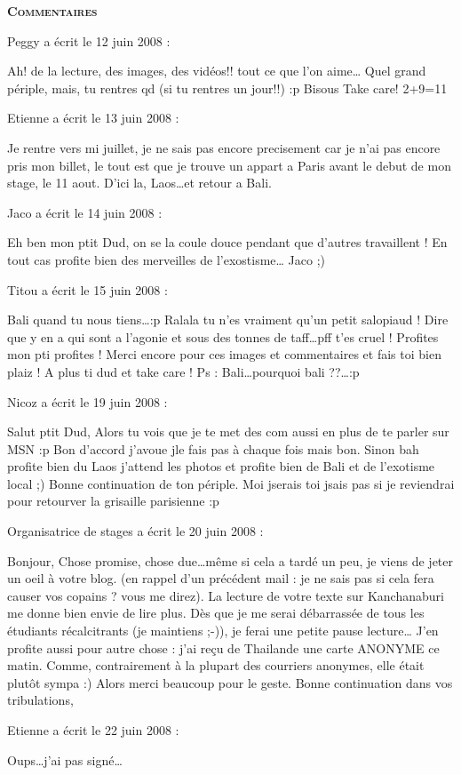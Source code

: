 \bigskip
\textbf{\textsc{Commentaires}}

\medskip
Peggy a écrit le 12 juin 2008 :
\begin{displayquote}
Ah! de la lecture, des images, des vidéos!! tout ce que l'on aime\dots
Quel grand périple, mais, tu rentres qd (si tu rentres un jour!!) :p
Bisous
Take care!
2+9=11
\end{displayquote}

\medskip
Etienne a écrit le 13 juin 2008 :
\begin{displayquote}
Je rentre vers mi juillet, je ne sais pas encore precisement car je n'ai pas encore pris mon billet, le tout est que je trouve un appart a Paris avant le debut de mon stage, le 11 aout.
D'ici la, Laos\dots et retour a Bali.
\end{displayquote}

\medskip
Jaco a écrit le 14 juin 2008 :
\begin{displayquote}
Eh ben mon ptit Dud, on se la coule douce pendant que d'autres travaillent !
En tout cas profite bien des merveilles de l'exostisme\dots
Jaco ;)
\end{displayquote}

\medskip
Titou a écrit le 15 juin 2008 :
\begin{displayquote}
Bali quand tu nous tiens\dots :p
Ralala tu n'es vraiment qu'un petit salopiaud ! Dire que y en a qui sont a l'agonie et sous des tonnes de taff\dots pff t'es cruel !
Profites mon pti profites !
Merci encore pour ces images et commentaires et fais toi bien plaiz !
A plus ti dud et take care !
Ps : Bali\dots pourquoi bali ??\dots :p
\end{displayquote}

\medskip
Nicoz a écrit le 19 juin 2008 :
\begin{displayquote}
Salut ptit Dud,
Alors tu vois que je te met des com aussi en plus de te parler sur MSN :p
Bon d'accord j'avoue jle fais pas à chaque fois mais bon.
Sinon bah profite bien du Laos j'attend les photos et profite bien de Bali et de l'exotisme local ;)
Bonne continuation de ton périple.
Moi jserais toi jsais pas si je reviendrai pour retourver la grisaille parisienne :p
\end{displayquote}

\medskip
Organisatrice de stages a écrit le 20 juin 2008 :
\begin{displayquote}
Bonjour,
Chose promise, chose due\dots même si cela a tardé un peu, je viens de jeter un oeil à votre blog. (en rappel d'un précédent mail : je ne sais pas si cela fera causer vos copains ? vous me direz).
La lecture de votre texte sur Kanchanaburi me donne bien envie de lire plus. Dès que je me serai débarrassée de tous les étudiants récalcitrants (je maintiens ;-)), je ferai une petite pause lecture\dots
J'en profite aussi pour autre chose : j'ai reçu de Thailande une carte ANONYME ce matin. Comme, contrairement à la plupart des courriers anonymes, elle était plutôt sympa :) Alors merci beaucoup pour le geste.
Bonne continuation dans vos tribulations,
\end{displayquote}

\medskip
Etienne a écrit le 22 juin 2008 :
\begin{displayquote}
Oups\dots j'ai pas signé\dots
\end{displayquote}

\vfill

